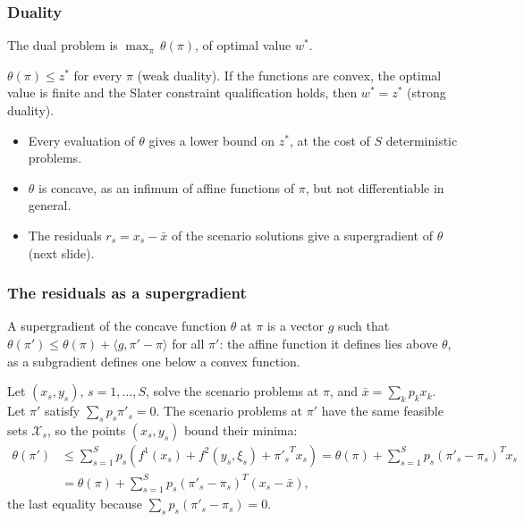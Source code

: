 \documentclass[aspectratio=169]{beamer}
\def\cX{\mathcal{X}}
\begin{document}
\begin{frame}
\frametitle{Duality}

The dual problem is $\max_{\pi}\, \theta(\pi)$, of optimal value $w^*$.

\begin{theorem}
$\theta(\pi) \leq z^*$ for every $\pi$ (weak duality).
If the functions are convex, the optimal value is finite and the Slater constraint qualification holds, then $w^* = z^*$ (strong duality).
\end{theorem}

\begin{itemize}
\item
Every evaluation of $\theta$ gives a lower bound on $z^*$, at the cost of $S$ deterministic problems.
\item
$\theta$ is concave, as an infimum of affine functions of $\pi$, but not differentiable in general.
\item
The residuals $r_s = x_s - \bar{x}$ of the scenario solutions give a supergradient of $\theta$ (next slide).
\end{itemize}

\end{frame}

\begin{frame}
\frametitle{The residuals as a supergradient}

A {\blue supergradient} of the concave function $\theta$ at $\pi$ is a vector $g$ such that $\theta(\pi') \leq \theta(\pi) + \langle g, \pi' - \pi \rangle$ for all $\pi'$: the affine function it defines lies above $\theta$, as a subgradient defines one below a convex function.

\mbox{}

Let $(x_s, y_s)$, $s = 1,\ldots,S$, solve the scenario problems at $\pi$, and $\bar{x} = \sum_k p_k x_k$. Let $\pi'$ satisfy $\sum_s p_s \pi'_s = 0$. The scenario problems at $\pi'$ have the same feasible sets $\cX_s$, so the points $(x_s, y_s)$ bound their minima:
\begin{align*}
\theta(\pi') &\leq \sum_{s=1}^S p_s \left( f^1(x_s) + f^2(y_s,\xi_s) + {\pi'_s}^T x_s \right)
= \theta(\pi) + \sum_{s=1}^S p_s (\pi'_s - \pi_s)^T x_s \\
&= \theta(\pi) + \sum_{s=1}^S p_s (\pi'_s - \pi_s)^T (x_s - \bar{x}),
\end{align*}
the last equality because $\sum_s p_s (\pi'_s - \pi_s) = 0$.

\end{frame}
\end{document}

